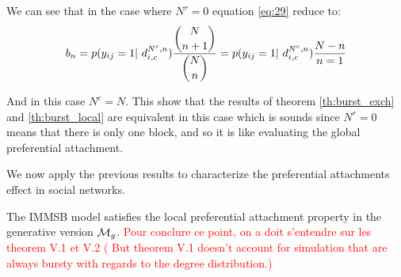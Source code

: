 We can see that in the case where $N^r=0$ equation \eqref{eq:29} reduce to:
\begin{equation}
b_n = p(y_{ij}=1 | d_{i,c}^{N^c,n}) \frac{\dbinom{N}{n+1}}{ \dbinom{N}{n} } =  p(y_{ij}=1 | d_{i,c}^{N^c,n}) \frac{N-n}{n=1}
\end{equation}

And in this case $N^c=N$. This show that the results of theorem \ref{th:burst_exch} and \ref{th:burst_local} are equivalent in this case which is sounds since $N^r=0$ means that there is only one block, and so it is like evaluating the global preferential attachment.

We now apply the previous results to characterize the preferential attachments effect in social networks.


\begin{proposition}
    The IMMSB model satisfies the local preferential attachment property in the generative version $\mathcal{M}_g$. \textcolor{red}{Pour conclure ce point,  on a doit s'entendre sur les theorem V.1 et V.2 ( But theorem V.1 doesn't account for simulation that are always bursty with regards to the degree distribution.)}
\end{proposition}

